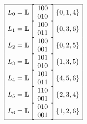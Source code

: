 \begin{table}
\begin{tcolorbox}[tabularx={X|X|},enhanced,fonttitle=\bfseries\large,fontupper=\normalsize\sffamily,
colback=yellow!10!white,colframe=green!50!black,colbacktitle=blue!30!white,
coltitle=black,title=Ranking Lines in Small Projective Spaces]
\begin{tcbitemize}[raster columns=2,raster equal height,
  colframe=red!75!black,colback=red!5!white,fonttitle=\bfseries]
\tcbitem[squeezed title*={$\PG(2,2)$}] 
$$
\begin{array}{|l|}
\hline
L_{0}={\bf L}\left[
\begin{array}{c}
100\\
010\\
\end{array}
\right]
\{0,1,4\}\\
L_{1}={\bf L}\left[
\begin{array}{c}
100\\
011\\
\end{array}
\right]
\{0,3,6\}\\
L_{2}={\bf L}\left[
\begin{array}{c}
100\\
001\\
\end{array}
\right]
\{0,2,5\}\\
L_{3}={\bf L}\left[
\begin{array}{c}
101\\
010\\
\end{array}
\right]
\{1,3,5\}\\
L_{4}={\bf L}\left[
\begin{array}{c}
101\\
011\\
\end{array}
\right]
\{4,5,6\}\\
L_{5}={\bf L}\left[
\begin{array}{c}
110\\
001\\
\end{array}
\right]
\{2,3,4\}\\
L_{6}={\bf L}\left[
\begin{array}{c}
010\\
001\\
\end{array}
\right]
\{1,2,6\}\\
\hline
\end{array}
$$
\end{tcbitemize}
\end{tcolorbox}
\end{table}
